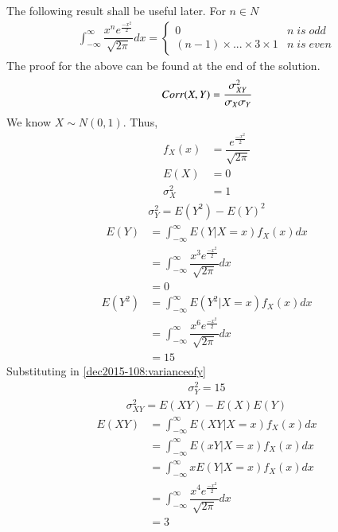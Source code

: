The following result shall be useful later. For $n \in N$
\begin{align}
    \int_{-\infty}^{\infty} \dfrac{x^n e^{\frac{-x^2}{2}}}{\sqrt{2\pi}}dx = 
    \begin{cases}
    0 & n\; is\; odd\\
    (n-1)\times...\times3\times1 & n\; is\; even
    \end{cases}
\end{align}
The proof for the above can be found at the end of the solution.
\begin{align}
    Corr(X,Y) = \cfrac{\sigma_{XY}^2}{\sigma_X\sigma_Y}
    \label{dec2015-108:correlationofxy}
\end{align}
We know $X \sim N(0,1)$. Thus,
\begin{align}
    f_X(x) &= \dfrac{e^{\frac{-x^2}{2}}}{\sqrt{2\pi}}\\
    E(X) &= 0\\
    \sigma_X^2 &= 1
\end{align}
\begin{align}
    \sigma_Y^2 = E(Y^2) - E(Y)^2
    \label{dec2015-108:varianceofy}
\end{align}
\begin{align}
    E(Y) &= \int_{-\infty}^{\infty}E(Y|X=x)f_X(x)dx\\
         &= \int_{-\infty}^{\infty}\dfrac{x^3 e^{\frac{-x^2}{2}}}{\sqrt{2\pi}}dx\\
         &= 0
\end{align}
\begin{align}
    E(Y^2) &= \int_{-\infty}^{\infty}E(Y^2|X=x)f_X(x)dx\\
           &= \int_{-\infty}^{\infty}\dfrac{x^6 e^{\frac{-x^2}{2}}}{\sqrt{2\pi}}dx\\
           &= 15
\end{align}
Substituting in \eqref{dec2015-108:varianceofy}
\begin{align}
    \sigma_Y^2 = 15
\end{align}
\begin{align}
    \sigma_{XY}^2 = E(XY) - E(X)E(Y)
    \label{dec2015-108:covarianceofxy}
\end{align}
\begin{align}
    E(XY) &= \int_{-\infty}^{\infty}E(XY|X=x)f_X(x)dx\\
          &= \int_{-\infty}^{\infty}E(xY|X=x)f_X(x)dx\\
          &= \int_{-\infty}^{\infty}xE(Y|X=x)f_X(x)dx\\
          &= \int_{-\infty}^{\infty}\dfrac{x^4 e^{\frac{-x^2}{2}}}{\sqrt{2\pi}}dx\\
          &= 3
\end{align}

